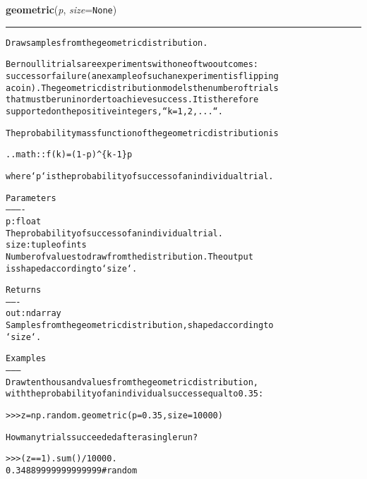 \hspace{.8\funcindent}\begin{boxedminipage}{\funcwidth}

    \raggedright \textbf{geometric}(\textit{p}, \textit{size}={\tt None})

    \vspace{-1.5ex}

    \rule{\textwidth}{0.5\fboxrule}
\setlength{\parskip}{2ex}
\begin{alltt}
Draw samples from the geometric distribution.

Bernoulli trials are experiments with one of two outcomes:
success or failure (an example of such an experiment is flipping
a coin).  The geometric distribution models the number of trials
that must be run in order to achieve success.  It is therefore
supported on the positive integers, ``k = 1, 2, ...``.

The probability mass function of the geometric distribution is

.. math:: f(k) = (1 - p){\textasciicircum}\{k - 1\} p

where `p` is the probability of success of an individual trial.

Parameters
----------
p : float
    The probability of success of an individual trial.
size : tuple of ints
    Number of values to draw from the distribution.  The output
    is shaped according to `size`.

Returns
-------
out : ndarray
    Samples from the geometric distribution, shaped according to
    `size`.

Examples
--------
Draw ten thousand values from the geometric distribution,
with the probability of an individual success equal to 0.35:

{\textgreater}{\textgreater}{\textgreater} z = np.random.geometric(p=0.35, size=10000)

How many trials succeeded after a single run?

{\textgreater}{\textgreater}{\textgreater} (z == 1).sum() / 10000.
0.34889999999999999 \#random
\end{alltt}

\setlength{\parskip}{1ex}
    \end{boxedminipage}

    \label{QSTK:qstklearn:mldiagnostics:get_state}

